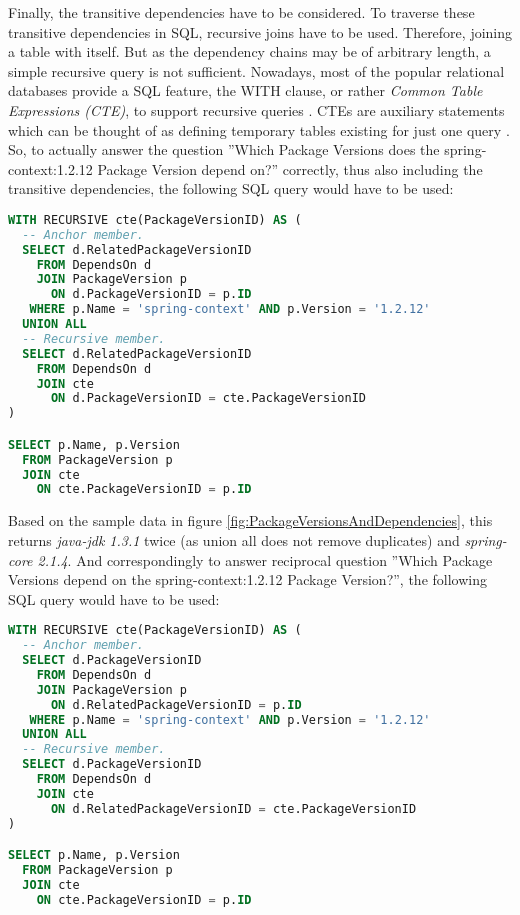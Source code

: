 Finally, the transitive dependencies have to be considered. To traverse these transitive dependencies in SQL, recursive joins have to be used. Therefore, joining a table with itself. But as the dependency chains may be of arbitrary length, a simple recursive query is not sufficient. Nowadays, most of the popular relational databases provide a SQL feature, the WITH clause, or rather \emph{Common Table Expressions (CTE)}, to support recursive queries \cite{mysqlCTE, postgresCTE, sqliteCTE}. CTEs are auxiliary statements which can be thought of as defining temporary tables existing for just one query \cite{postgresCTE}. So, to actually answer the question ''Which Package Versions does the spring-context:1.2.12 Package Version depend on?'' correctly, thus also including the transitive dependencies, the following SQL query would have to be used:

\begin{lstlisting}[language=SQL, caption=Package Version Dependencies (including transitive), captionpos=b, label=lst:PackageVersionDependenciesIncTransitive]
WITH RECURSIVE cte(PackageVersionID) AS (
  -- Anchor member.
  SELECT d.RelatedPackageVersionID
    FROM DependsOn d
    JOIN PackageVersion p
      ON d.PackageVersionID = p.ID
   WHERE p.Name = 'spring-context' AND p.Version = '1.2.12'
  UNION ALL
  -- Recursive member.
  SELECT d.RelatedPackageVersionID
    FROM DependsOn d
    JOIN cte
      ON d.PackageVersionID = cte.PackageVersionID
)

SELECT p.Name, p.Version
  FROM PackageVersion p
  JOIN cte
    ON cte.PackageVersionID = p.ID
\end{lstlisting}

Based on the sample data in figure \ref{fig:PackageVersionsAndDependencies}, this returns \emph{java-jdk 1.3.1} twice (as union all does not remove duplicates) and \emph{spring-core 2.1.4}. And correspondingly to answer reciprocal question ''Which Package Versions depend on the spring-context:1.2.12 Package Version?'', the following SQL query would have to be used:

\begin{lstlisting}[language=SQL, caption=Package Version Reciprocal Dependencies (including transitive), captionpos=b, label=lst:PackageVersionReciprocalDependenciesIncTransitive]
WITH RECURSIVE cte(PackageVersionID) AS (
  -- Anchor member.
  SELECT d.PackageVersionID
    FROM DependsOn d
    JOIN PackageVersion p
      ON d.RelatedPackageVersionID = p.ID
   WHERE p.Name = 'spring-context' AND p.Version = '1.2.12'
  UNION ALL
  -- Recursive member.
  SELECT d.PackageVersionID
    FROM DependsOn d
    JOIN cte
      ON d.RelatedPackageVersionID = cte.PackageVersionID
)

SELECT p.Name, p.Version
  FROM PackageVersion p
  JOIN cte
    ON cte.PackageVersionID = p.ID
\end{lstlisting}

